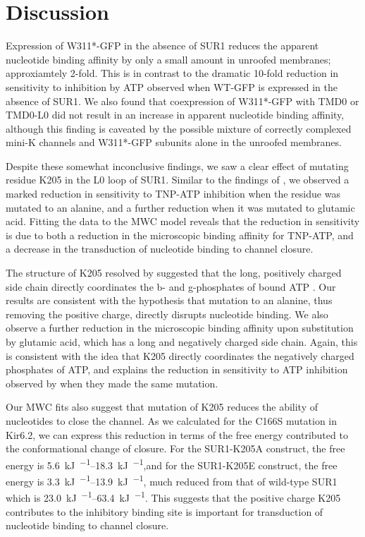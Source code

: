 \section{Discussion}

Expression of W311*-GFP in the absence of SUR1 reduces the apparent nucleotide binding affinity by only a small amount in unroofed membranes; approxiamtely 2-fold.
This is in contrast to the dramatic 10-fold reduction in sensitivity to inhibition by ATP observed when WT-GFP is expressed in the absence of SUR1.
We also found that coexpression of W311*-GFP with TMD0 or TMD0-L0 did not result in an increase in apparent nucleotide binding affinity, although this finding is caveated by the possible mixture of correctly complexed mini-K\ATP{} channels and W311*-GFP subunits alone in the unroofed membranes.

Despite these somewhat inconclusive findings, we saw a clear effect of mutating residue K205 in the L0 loop of SUR1.
Similar to the findings of \textcite{ding_structural_2019}, we observed a marked reduction in sensitivity to TNP-ATP inhibition when the residue was mutated to an alanine, and a further reduction when it was mutated to glutamic acid.
Fitting the data to the MWC model reveals that the reduction in sensitivity is due to both a reduction in the microscopic binding affinity for TNP-ATP, and a decrease in the transduction of nucleotide binding to channel closure.

The structure of K205 resolved by \textcite{ding_structural_2019} suggested that the long, positively charged side chain directly coordinates the \textgreek{b}- and \textgreek{g}-phosphates of bound ATP \cite{ding_structural_2019}.
Our results are consistent with the hypothesis that mutation to an alanine, thus removing the positive charge, directly disrupts nucleotide binding.
We also observe a further reduction in the microscopic binding affinity upon substitution by glutamic acid, which has a long and negatively charged side chain.
Again, this is consistent with the idea that K205 directly coordinates the negatively charged phosphates of ATP, and explains the reduction in sensitivity to ATP inhibition observed by \textcite{pratt_engineered_2012} when they made the same mutation.

Our MWC fits also suggest that mutation of K205 reduces the ability of nucleotides to close the channel.
As we calculated for the C166S mutation in Kir6.2, we can express this reduction in terms of the free energy contributed to the conformational change of closure.
For the SUR1-K205A construct, the free energy is \SIrange{5.6}{18.3}{\kilo\joule\per\Molar},and for the SUR1-K205E construct, the free energy is \SIrange{3.3}{13.9}{\kilo\joule\per\Molar}, much reduced from that of wild-type SUR1 which is \SIrange{23.0}{63.4}{\kilo\joule\per\Molar}.
This suggests that the positive charge K205 contributes to the inhibitory binding site is important for transduction of nucleotide binding to channel closure.

